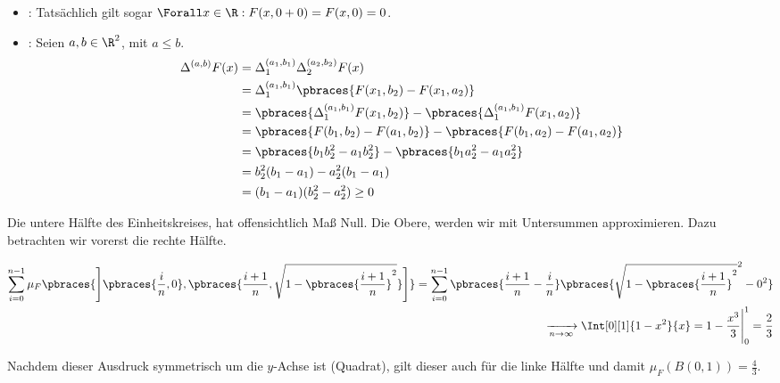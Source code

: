 \begin{solution}

\phantom{}

\begin{itemize}

  \item {}: Tatsächlich gilt sogar $\Forall x \in \R: F(x, 0 + 0) = F(x, 0) = 0$.

  \item {}: Seien $a, b \in \R^2$, mit $a \leq b$.
  \begin{align*}
    \Delta^{(a, b)} F(x)
    & =
    \Delta_1^{(a_1, b_1)}
    \Delta_2^{(a_2, b_2)}
    F(x) \\
    & =
    \Delta_1^{(a_1, b_1)}
    \pbraces{F(x_1, b_2) - F(x_1, a_2)} \\
    & =
    \pbraces{\Delta_1^{(a_1, b_1)} F(x_1, b_2)} -
    \pbraces{\Delta_1^{(a_1, b_1)} F(x_1, a_2)} \\
    & =
    \pbraces{F(b_1, b_2) - F(a_1, b_2)} -
    \pbraces{F(b_1, a_2) - F(a_1, a_2)} \\
    & =
    \pbraces{b_1 b_2^2 - a_1 b_2^2} -
    \pbraces{b_1 a_2^2 - a_1 a_2^2} \\
    & =
    b_2^2 (b_1 - a_1) - a_2^2 (b_1 - a_1) \\
    & =
    (b_1 - a_1) (b_2^2 - a_2^2)
    \geq
    0
  \end{align*}

\end{itemize}

Die untere Hälfte des Einheitskreises, hat offensichtlich Maß Null. Die Obere, werden wir mit Untersummen approximieren. Dazu betrachten wir vorerst die rechte Hälfte.

\begin{align*}
  \sum_{i=0}^{n-1}
  \mu_F
  \pbraces
  {
    \Bigg ]
      \pbraces{\frac{i}{n}, 0},
      \pbraces{\frac{i+1}{n}, \sqrt{1 - \pbraces{\frac{i+1}{n}}^2}}
    \Bigg ]
  }
  =
  \sum_{i=0}^{n-1}
  \pbraces{\frac{i+1}{n} - \frac{i}{n}}
  \pbraces{\sqrt{1 - \pbraces{\frac{i+1}{n}}^2}^2 - 0^2} \\
  \xrightarrow[n \to \infty]{}
  \Int[0][1]{1 - x^2}{x}
  =
  1 - \frac{x^3}{3} \Bigg |_0^1
  =
  \frac{2}{3}
\end{align*}

Nachdem dieser Ausdruck symmetrisch um die $y$-Achse ist (Quadrat), gilt dieser auch für die linke Hälfte und damit $\mu_F(B(0, 1)) = \frac{4}{3}$.

\end{solution}

